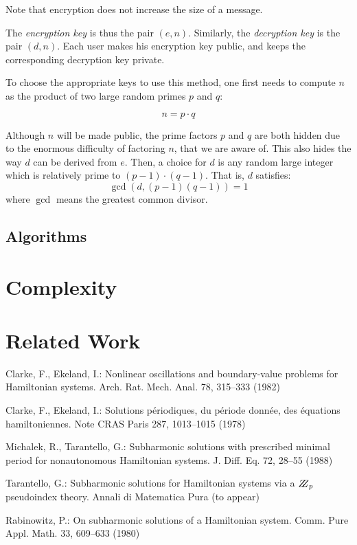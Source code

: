 \documentclass{llncs}
\begin{document}
Note that encryption does not increase the size of a message.

The \emph{encryption key} is thus the pair $(e, n)$. Similarly, the
\emph{decryption key} is the pair $(d, n)$. Each user makes his encryption key
public, and keeps the corresponding decryption key private.

To choose the appropriate keys to use this method, one first needs to compute
$n$ as the product of two large random primes $p$ and $q$:

\begin{equation*}
   n = p \cdot q 
\end{equation*}

Although $n$ will be made public, the prime factors $p$ and $q$ are both
hidden due to the enormous difficulty of factoring $n$, that we are aware of.
This also hides the way $d$ can be derived from $e$. Then, a choice for $d$ is
any random large integer which is relatively prime to $(p - 1)\cdot(q - 1)$.
That is, $d$ satisfies:
\begin{equation*}
    \gcd(d, (p-1)(q-1)) = 1   
\end{equation*}
where $\gcd$ means the greatest common divisor.

\subsection{Algorithms}
\label{algorithms}

\section{Complexity}
\label{complexity}

\section{Related Work}
\label{work}


%
%
\begin{thebibliography}{5}
%
Clarke, F., Ekeland, I.:
Nonlinear oscillations and
boundary-value problems for Hamiltonian systems.
Arch. Rat. Mech. Anal. 78, 315--333 (1982)

Clarke, F., Ekeland, I.:
Solutions p\'{e}riodiques, du
p\'{e}riode donn\'{e}e, des \'{e}quations hamiltoniennes.
Note CRAS Paris 287, 1013--1015 (1978)

Michalek, R., Tarantello, G.:
Subharmonic solutions with prescribed minimal
period for nonautonomous Hamiltonian systems.
J. Diff. Eq. 72, 28--55 (1988)

Tarantello, G.:
Subharmonic solutions for Hamiltonian
systems via a $\bbbz_{p}$ pseudoindex theory.
Annali di Matematica Pura (to appear)

Rabinowitz, P.:
On subharmonic solutions of a Hamiltonian system.
Comm. Pure Appl. Math. 33, 609--633 (1980)

\end{thebibliography}
\end{document}
